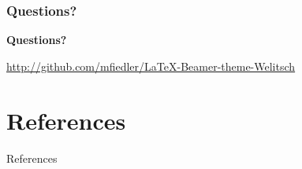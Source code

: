 \documentclass[12pt]{beamer}
\begin{document}
\begin{frame}
\frametitle{Questions?}
\begin{center}
\Huge \textbf{Questions?}
\end{center}
\begin{center}
\url{http://github.com/mfiedler/LaTeX-Beamer-theme-Welitsch}
\end{center}
\end{frame}


\section{References}
\begin{frame}{References}


\end{frame}
\end{document}
